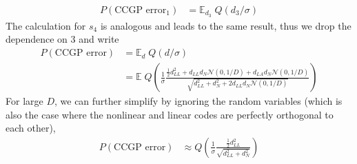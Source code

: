 \documentclass[letter,12pt]{article}
\newcommand{\dll}{d_{LL}}
\newcommand{\dla}{d_{LA}}
\newcommand{\dn}{d_{N}}
\newcommand{\dis}{\mathcal{N}(0, 1/D)}
\newcommand{\fno}{f_{2N}^{\text{opt}}}
\begin{document}
\begin{align}
  P(\textrm{CCGP error}_{1}) &= \mathbb{E}_{d_{3}} \; Q\left(d_{3}/\sigma\right)
\end{align}
The calculation for $s_{4}$ is analogous and leads to the same result,
thus we drop the dependence on $3$ and write
\begin{align}
  P(\textrm{CCGP error}) &= \mathbb{E}_{d} \; Q\left(d/\sigma\right) \\
  &= \mathbb{E} \; Q\left(\frac{1}{\sigma}
  \frac{\frac{1}{2}\dll^{2} + \dll\dn \dis + \dla\dn \dis}
  {\sqrt{\dll^{2} + \dn^{2} + 2 \dll \dn \dis}}\right)
\end{align}
For large $D$, we can further simplify by ignoring the random variables
(which is also the case where the nonlinear and linear codes are perfectly
orthogonal to each other),
\begin{align}
  P(\textrm{CCGP error}) &\approx Q\left(\frac{1}{\sigma}
  \frac{\frac{1}{2}\dll^{2}}
  {\sqrt{\dll^{2} + \dn^{2}}}\right)
\end{align}


\end{document}
